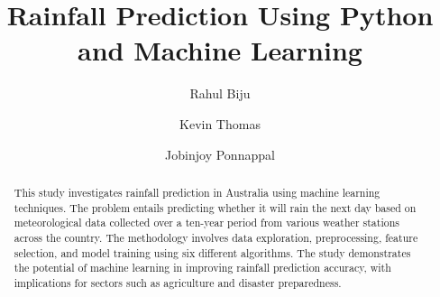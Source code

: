 \documentclass{josis}
\begin{document}
\renewcommand{\topfraction}{0.9} 
\renewcommand{\textfraction}{0.1}

\sloppy
{}


\makeatletter
\let\UrlSpecialsOld\UrlSpecials
\def\UrlSpecials{\UrlSpecialsOld\do\/{\Url@slash}\do\_{\Url@underscore}}%
\def\Url@slash{\@ifnextchar/{\kern-.11em\mathchar47\kern-.2em}%
    {\kern-.0em\mathchar47\kern-.08em\penalty\UrlBigBreakPenalty}}
\def\Url@underscore{\nfss@text{\leavevmode \kern.06em\vbox{\hrule\@width.3em}}}
\makeatother

\hypersetup{
colorlinks=true,
linkcolor=black,
citecolor=black,
urlcolor=black
} 


\title{Rainfall Prediction Using Python and Machine Learning}

\author{Rahul Biju}
\author{Kevin Thomas }
\author{Jobinjoy Ponnappal}
\date{}

\maketitle




\maketitle
\begin{abstract}
This study investigates rainfall prediction in Australia using machine learning techniques. The problem entails predicting whether it will rain the next day based on meteorological data collected over a ten-year period from various weather stations across the country. The methodology involves data exploration, preprocessing, feature selection, and model training using six different algorithms. The study demonstrates the potential of machine learning in improving rainfall prediction accuracy, with implications for sectors such as agriculture and disaster preparedness. 
\end{abstract}
\end{document}
